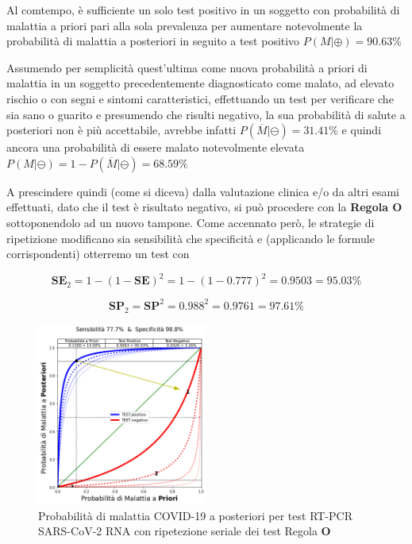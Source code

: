 \documentclass[11pt]{article}
\begin{document}
    
    Al comtempo, è sufficiente un solo test positivo in un soggetto con
probabilità di malattia a priori pari alla sola prevalenza per aumentare
notevolmente la probabilità di malattia a posteriori in seguito a test
positivo \(P(M|\oplus) = 90.63\)\%

    
    Assumendo per semplicità quest'ultima come nuova probabilità a priori di
malattia in un soggetto precedentemente diagnosticato come malato, ad
elevato rischio o con segni e sintomi caratteristici, effettuando un
test per verificare che sia sano o guarito e presumendo che risulti
negativo, la sua probabilità di salute a posteriori non è più
accettabile, avrebbe infatti \(P(\overline{M}|\ominus) = 31.41\%\) e
quindi ancora una probabilità di essere malato notevolmente elevata
\(P(M|\ominus) = 1 - P(\overline{M}|\ominus) = 68.59\%\)

    
    A prescindere quindi (come si diceva) dalla valutazione clinica e/o da
altri esami effettuati, dato che il test è risultato negativo, si può
procedere con la \textbf{Regola O} sottoponendolo ad un nuovo tampone.
Come accennato però, le strategie di ripetizione modificano sia
sensibilità che specificità e (applicando le formule corrispondenti)
otterremo un test con

\[
\mathbf{SE}_2 = 1 - (1 - \mathbf{SE})^2 = 1 - (1 - 0.777)^2 = 0.9503 = 95.03\%
\]

\[
\mathbf{SP}_2 = \mathbf{SP}^2 = 0.988^2 = 0.9761 = 97.61\%
\]

    
    \begin{figure}
\centering
    \includegraphics[width=0.5\textwidth,height=0.5\textheight,keepaspectratio]{covid}
    \caption{Probabilità di malattia COVID-19 a posteriori per test RT-PCR SARS-CoV-2 RNA con ripetezione seriale dei test Regola $\mathbf{O}$}
    \label{fig:covid}
\end{figure}
\end{document}

